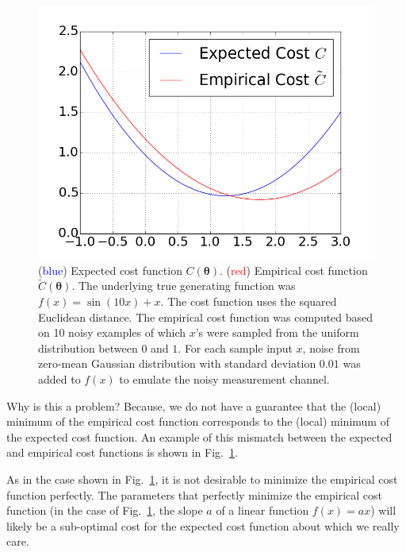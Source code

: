 \documentclass{report}
\newcommand{\vects}[1]{\boldsymbol{#1}}
\newcommand{\TT}[0]{\vects{\theta}}
\begin{document}
\begin{figure}
    \centering
    \begin{minipage}{0.6\textwidth}
        \includegraphics[width=\columnwidth]{figures/cost_figure.png}
    \end{minipage}
    \hfill
    \begin{minipage}{0.39\textwidth}
        \caption{(\textcolor{blue}{blue}) Expected cost function $C(\TT)$.
            (\textcolor{red}{red}) Empirical cost function $\tilde{C}(\TT)$.
            The underlying true generating function was $f(x) = \sin(10x) + x$.
            The cost function uses the squared Euclidean distance.
            The empirical cost function was computed based on 10 noisy
            examples of which $x$'s were sampled from the uniform distribution
        between $0$ and $1$. For each sample input $x$, noise from zero-mean Gaussian
    distribution with standard deviation $0.01$ was added to $f(x)$ to emulate
the noisy measurement channel.}
        \label{fig:cost}
    \end{minipage}
\end{figure}

Why is this a problem? Because, we do not have a guarantee that the (local)
minimum of the empirical cost function corresponds to the (local) minimum of the
expected cost function. An example of this mismatch between the expected and
empirical cost functions is shown in Fig.~\ref{fig:cost}.

As in the case shown in Fig.~\ref{fig:cost}, it is not desirable to minimize the
empirical cost function perfectly. The parameters that perfectly minimize the
empirical cost function (in the case of
Fig.~\ref{fig:cost}, the slope $a$ of a linear function $f(x) = a x$) will
likely be a sub-optimal cost for the expected cost function about which we
really care. 
\end{document}
